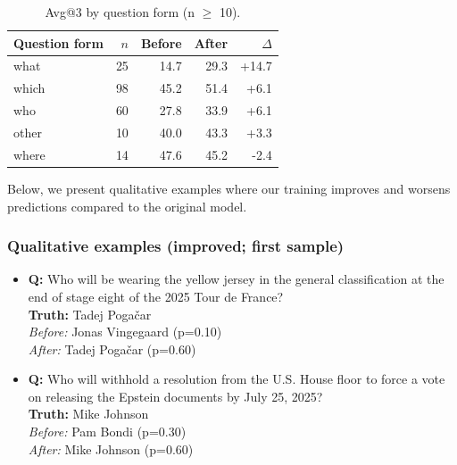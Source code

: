 \documentclass{article} %
\begin{document}
\begin{table}[h]
\centering
\begin{tabular}{lrrrr}
\hline
Question form & $n$ & Before & After & $\Delta$ \\ 
\hline
what & 25 & 14.7 & 29.3 & +14.7 \\
which & 98 & 45.2 & 51.4 & +6.1 \\
who & 60 & 27.8 & 33.9 & +6.1 \\
other & 10 & 40.0 & 43.3 & +3.3 \\
where & 14 & 47.6 & 45.2 & -2.4 \\
\hline
\end{tabular}
\caption{Avg@3 by question form (n $\ge$ 10).}
\label{tab:questionform}
\end{table}


Below, we present qualitative examples where our training improves and worsens predictions compared to the original model. 

\subsubsection*{Qualitative examples (improved; first sample)}
\begin{itemize}
\item \textbf{Q:} Who will be wearing the yellow jersey in the general classification at the end of stage eight of the 2025 Tour de France? \\
\textbf{Truth:} Tadej Poga{\v{c}}ar \\
\emph{Before:} Jonas Vingegaard (p=0.10) \\
\emph{After:} Tadej Poga{\v{c}}ar (p=0.60)

\item \textbf{Q:} Who will withhold a resolution from the U.S. House floor to force a vote on releasing the Epstein documents by July 25, 2025? \\
\textbf{Truth:} Mike Johnson \\
\emph{Before:} Pam Bondi (p=0.30) \\
\emph{After:} Mike Johnson (p=0.60)
\end{itemize}
\end{document}
